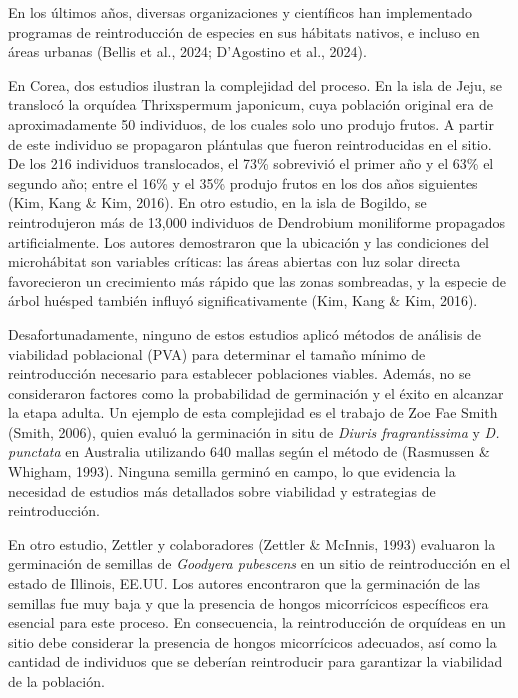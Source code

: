\documentclass[
  12pt,
  letterpaper,
]{book}
\begin{document}
En los últimos años, diversas organizaciones y científicos han
implementado programas de reintroducción de especies en sus hábitats
nativos, e incluso en áreas urbanas (Bellis et al., 2024; D'Agostino et
al., 2024).

En Corea, dos estudios ilustran la complejidad del proceso. En la isla
de Jeju, se translocó la orquídea Thrixspermum japonicum, cuya población
original era de aproximadamente 50 individuos, de los cuales solo uno
produjo frutos. A partir de este individuo se propagaron plántulas que
fueron reintroducidas en el sitio. De los 216 individuos translocados,
el 73\% sobrevivió el primer año y el 63\% el segundo año; entre el 16\%
y el 35\% produjo frutos en los dos años siguientes (Kim, Kang \& Kim,
2016). En otro estudio, en la isla de Bogildo, se reintrodujeron más de
13,000 individuos de Dendrobium moniliforme propagados artificialmente.
Los autores demostraron que la ubicación y las condiciones del
microhábitat son variables críticas: las áreas abiertas con luz solar
directa favorecieron un crecimiento más rápido que las zonas sombreadas,
y la especie de árbol huésped también influyó significativamente (Kim,
Kang \& Kim, 2016).

Desafortunadamente, ninguno de estos estudios aplicó métodos de análisis
de viabilidad poblacional (PVA) para determinar el tamaño mínimo de
reintroducción necesario para establecer poblaciones viables. Además, no
se consideraron factores como la probabilidad de germinación y el éxito
en alcanzar la etapa adulta. Un ejemplo de esta complejidad es el
trabajo de Zoe Fae Smith (Smith, 2006), quien evaluó la germinación in
situ de \emph{Diuris fragrantissima} y \emph{D. punctata} en Australia
utilizando 640 mallas según el método de (Rasmussen \& Whigham, 1993).
Ninguna semilla germinó en campo, lo que evidencia la necesidad de
estudios más detallados sobre viabilidad y estrategias de
reintroducción.

En otro estudio, Zettler y colaboradores (Zettler \& McInnis, 1993)
evaluaron la germinación de semillas de \emph{Goodyera pubescens} en un
sitio de reintroducción en el estado de Illinois, EE.UU. Los autores
encontraron que la germinación de las semillas fue muy baja y que la
presencia de hongos micorrícicos específicos era esencial para este
proceso. En consecuencia, la reintroducción de orquídeas en un sitio
debe considerar la presencia de hongos micorrícicos adecuados, así como
la cantidad de individuos que se deberían reintroducir para garantizar
la viabilidad de la población.
\end{document}
